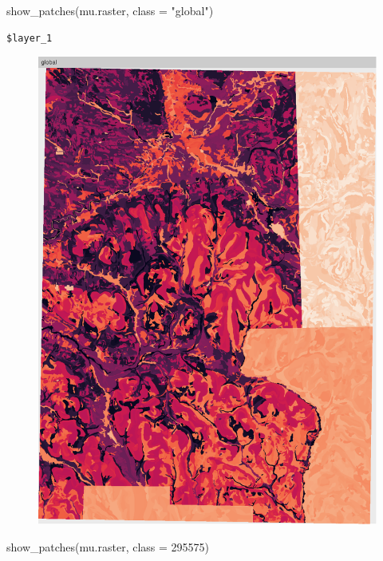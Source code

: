 \documentclass[
  letterpaper,
  DIV=11,
  numbers=noendperiod]{scrartcl}
\newenvironment{Shaded}{\begin{snugshade}}{\end{snugshade}}
\newcommand{\AttributeTok}[1]{\textcolor[rgb]{0.40,0.45,0.13}{#1}}
\newcommand{\DecValTok}[1]{\textcolor[rgb]{0.68,0.00,0.00}{#1}}
\newcommand{\FunctionTok}[1]{\textcolor[rgb]{0.28,0.35,0.67}{#1}}
\newcommand{\NormalTok}[1]{\textcolor[rgb]{0.00,0.23,0.31}{#1}}
\newcommand{\StringTok}[1]{\textcolor[rgb]{0.13,0.47,0.30}{#1}}
\begin{document}
\begin{Shaded}
\begin{Highlighting}[]
\FunctionTok{show\_patches}\NormalTok{(mu.raster, }\AttributeTok{class =} \StringTok{"global"}\NormalTok{)}
\end{Highlighting}
\end{Shaded}

\begin{verbatim}
$layer_1
\end{verbatim}

\begin{figure}[H]

{\centering \includegraphics{PatternAnalysisWorkshopTutorial_files/figure-pdf/show.landscape.gn-1.pdf}

}

\end{figure}

\begin{Shaded}
\begin{Highlighting}[]
 \FunctionTok{show\_patches}\NormalTok{(mu.raster, }\AttributeTok{class =} \DecValTok{295575}\NormalTok{)}
\end{Highlighting}
\end{Shaded}
\end{document}
